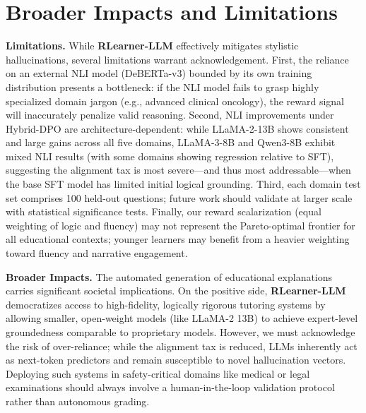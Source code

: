\section*{Broader Impacts and Limitations}

\textbf{Limitations.} While \textbf{RLearner-LLM} effectively mitigates stylistic hallucinations, several limitations warrant acknowledgement. First, the reliance on an external NLI model (DeBERTa-v3) bounded by its own training distribution presents a bottleneck: if the NLI model fails to grasp highly specialized domain jargon (e.g., advanced clinical oncology), the reward signal will inaccurately penalize valid reasoning. Second, NLI improvements under Hybrid-DPO are architecture-dependent: while LLaMA-2-13B shows consistent and large gains across all five domains, LLaMA-3-8B and Qwen3-8B exhibit mixed NLI results (with some domains showing regression relative to SFT), suggesting the alignment tax is most severe---and thus most addressable---when the base SFT model has limited initial logical grounding. Third, each domain test set comprises 100 held-out questions; future work should validate at larger scale with statistical significance tests. Finally, our reward scalarization (equal weighting of logic and fluency) may not represent the Pareto-optimal frontier for all educational contexts; younger learners may benefit from a heavier weighting toward fluency and narrative engagement.

\textbf{Broader Impacts.} The automated generation of educational explanations carries significant societal implications. On the positive side, \textbf{RLearner-LLM} democratizes access to high-fidelity, logically rigorous tutoring systems by allowing smaller, open-weight models (like LLaMA-2 13B) to achieve expert-level groundedness comparable to proprietary models. However, we must acknowledge the risk of over-reliance; while the alignment tax is reduced, LLMs inherently act as next-token predictors and remain susceptible to novel hallucination vectors. Deploying such systems in safety-critical domains like medical or legal examinations should always involve a human-in-the-loop validation protocol rather than autonomous grading.
